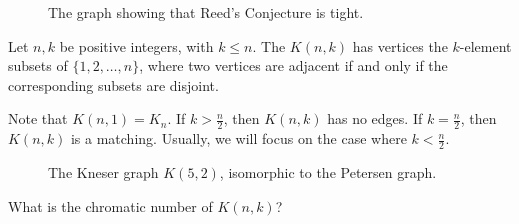 \begin{figure}[htbp]
    \centering
    \caption{The graph showing that Reed's Conjecture is tight.}
\end{figure}

Let \(n, k\) be positive integers, with \(k \leq n\).
The  \(K(n, k)\) has vertices the \(k\)-element subsets of \(\{1, 2, \ldots, n\}\), where two vertices are adjacent if and only if the corresponding subsets are disjoint.

Note that \(K(n, 1) = K_n\).
If \(k > \frac{n}{2}\), then \(K(n, k)\) has no edges.
If \(k = \frac{n}{2}\), then \(K(n, k)\) is a matching.
Usually, we will focus on the case where \(k < \frac{n}{2}\).

\begin{figure}[htbp]
    \centering
    \caption{The Kneser graph \(K(5, 2)\), isomorphic to the Petersen graph.}
\end{figure}

\begin{question}
    What is the chromatic number of \(K(n, k)\)?
\end{question}

